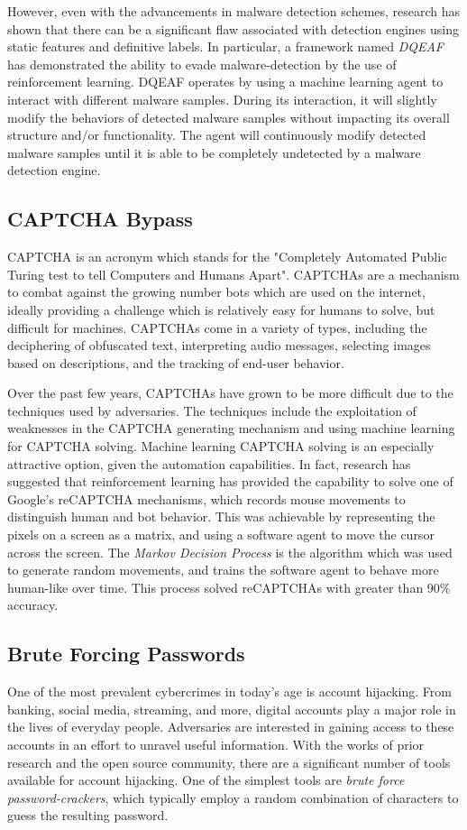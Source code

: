 \documentclass[11pt,conference]{IEEEtran}
\begin{document}
However, even with the advancements in malware detection schemes, research
has shown that there can be a significant flaw associated with detection
engines using static features and definitive labels. In particular, a framework
named \emph{DQEAF} has demonstrated the ability to evade malware-detection by
the use of reinforcement learning. DQEAF operates by using a machine
learning agent to interact with different malware samples. During its
interaction, it will slightly modify the behaviors of detected malware samples
without impacting its overall structure and/or functionality. The agent will
continuously modify detected malware samples until it is able to be completely
undetected by a malware detection engine.

\subsection{CAPTCHA Bypass}
CAPTCHA is an acronym which stands for the "Completely Automated Public Turing test
to tell Computers and Humans Apart". CAPTCHAs are a 
mechanism to combat against the growing number bots which are used on the
internet, ideally providing a challenge which is relatively easy for humans to
solve, but difficult for machines. CAPTCHAs come in a variety of types,
including the deciphering of obfuscated text, interpreting audio messages,
selecting images based on descriptions, and the tracking of end-user behavior.

Over the past few years, CAPTCHAs have grown to be more difficult due to the
techniques used by adversaries. The techniques include the exploitation of
weaknesses in the CAPTCHA generating mechanism
and using machine learning for CAPTCHA solving. Machine learning
CAPTCHA solving is an especially attractive option, given the automation
capabilities. In fact, research has suggested that reinforcement learning has
provided the capability to solve one of Google's reCAPTCHA mechanisms, which
records mouse movements to distinguish human and bot behavior. This was
achievable by representing the pixels on a screen as a matrix, and using a
software agent to move the
cursor across the screen. The \emph{Markov
Decision Process} is the algorithm which was used to generate random movements,
and trains the software agent to behave more human-like over time. This
process solved reCAPTCHAs with greater than 90\% accuracy.

\subsection{Brute Forcing Passwords}
One of the most prevalent cybercrimes in today's age is account hijacking. From
banking, social media, streaming, and more, digital accounts play a major role
in the lives of everyday people. Adversaries are interested in
gaining access to these accounts in an effort to unravel useful information.
With the works of prior research and the open source community, there are a
significant number of tools available for account hijacking. One of the
simplest tools are \emph{brute force password-crackers}, which typically employ a random
combination of characters to guess the resulting password.
\end{document}
